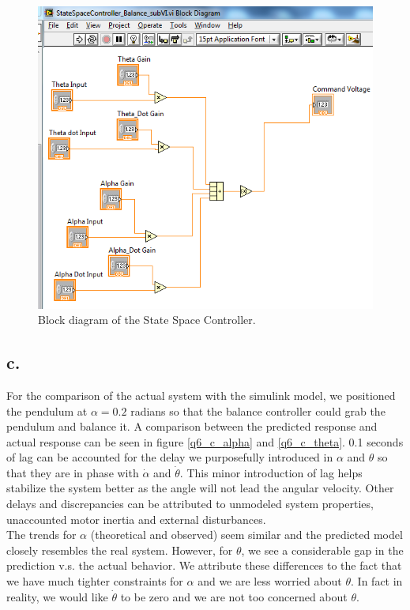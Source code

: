 \documentclass{article}
\theoremstyle{plain}
\theoremstyle{definition}
\theoremstyle{remark}
\begin{document}
\begin{figure}[htb]
\begin{center}
\includegraphics[width = 14cm]{q6_b8.png}
\end{center}
\caption{Block diagram of the State Space Controller.}
\label{q6_b8}
\end{figure}

\clearpage

\subsection*{c.}
For the comparison of the actual system with the simulink model, we positioned the pendulum at $\alpha = 0.2$ radians so that the balance controller could grab the pendulum and balance it. A comparison between the predicted response and actual response can be seen in figure \ref{q6_c_alpha} and \ref{q6_c_theta}. 0.1 seconds of lag can be accounted for the delay we purposefully introduced in $\alpha$ and $\theta$ so that they are in phase with $\dot{\alpha}$ and $\dot{\theta}$. This minor introduction of lag helps stabilize the system better as the angle will not lead the angular velocity. Other delays and discrepancies can be attributed to unmodeled  system properties, unaccounted motor inertia and external disturbances.\\

 The trends for $\alpha$ (theoretical and observed) seem similar and the predicted model closely resembles the real system. However, for $\theta$, we see a considerable gap in the prediction v.s. the actual behavior. We attribute these differences to the fact that we have much tighter constraints for $\alpha$ and we are less worried about $\theta$. In fact in reality, we would like $\dot{\theta}$ to be zero and we are not too concerned about $\theta$.
\end{document}
